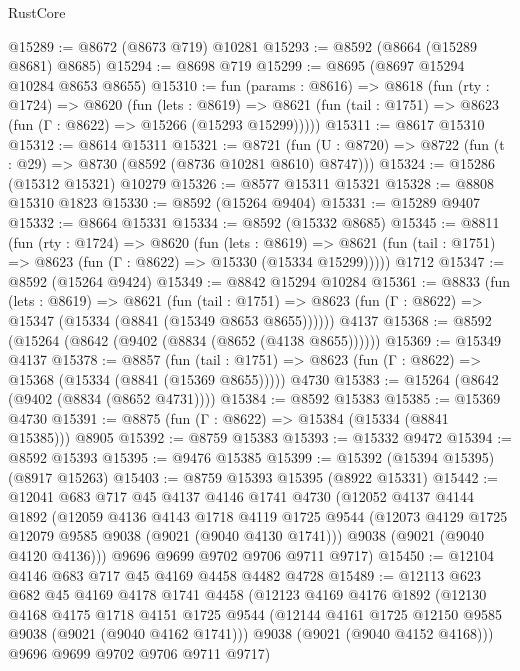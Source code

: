 \begin{lexlean}{RustCore}
\begin{coremodule}
@15289 := @8672 (@8673 @719) @10281
@15293 := @8592 (@8664 (@15289 @8681) @8685)
@15294 := @8698 @719
@15299 := @8695 (@8697 @15294 @10284 @8653 @8655)
@15310 := fun (params : @8616) =>
  @8618
    (fun (rty : @1724) =>
    @8620
      (fun (lets : @8619) =>
      @8621 (fun (tail : @1751) => @8623 (fun (Γ : @8622) => @15266 (@15293 @15299)))))
@15311 := @8617 @15310
@15312 := @8614 @15311
@15321 := @8721
    (fun (U : @8720) => @8722 (fun (t : @29) => @8730 (@8592 (@8736 @10281 @8610) @8747)))
@15324 := @15286 (@15312 @15321) @10279
@15326 := @8577 @15311 @15321
@15328 := @8808 @15310 @1823
@15330 := @8592 (@15264 @9404)
@15331 := @15289 @9407
@15332 := @8664 @15331
@15334 := @8592 (@15332 @8685)
@15345 := @8811
    (fun (rty : @1724) =>
    @8620
      (fun (lets : @8619) =>
      @8621 (fun (tail : @1751) => @8623 (fun (Γ : @8622) => @15330 (@15334 @15299)))))
    @1712
@15347 := @8592 (@15264 @9424)
@15349 := @8842 @15294 @10284
@15361 := @8833
    (fun (lets : @8619) =>
    @8621
      (fun (tail : @1751) =>
      @8623 (fun (Γ : @8622) => @15347 (@15334 (@8841 (@15349 @8653 @8655))))))
    @4137
@15368 := @8592 (@15264 (@8642 (@9402 (@8834 (@8652 (@4138 @8655))))))
@15369 := @15349 @4137
@15378 := @8857
    (fun (tail : @1751) => @8623 (fun (Γ : @8622) => @15368 (@15334 (@8841 (@15369 @8655)))))
    @4730
@15383 := @15264 (@8642 (@9402 (@8834 (@8652 @4731))))
@15384 := @8592 @15383
@15385 := @15369 @4730
@15391 := @8875 (fun (Γ : @8622) => @15384 (@15334 (@8841 @15385))) @8905
@15392 := @8759 @15383
@15393 := @15332 @9472
@15394 := @8592 @15393
@15395 := @9476 @15385
@15399 := @15392 (@15394 @15395) (@8917 @15263)
@15403 := @8759 @15393 @15395 (@8922 @15331)
@15442 := @12041
    @683
    @717
    @45
    @4137
    @4146
    @1741
    @4730
    (@12052
      @4137
      @4144
      @1892
      (@12059
        @4136
        @4143
        @1718
        @4119
        @1725
        @9544
        (@12073 @4129 @1725 @12079 @9585 @9038 (@9021 (@9040 @4130 @1741)))
        @9038
        (@9021 (@9040 @4120 @4136)))
      @9696
      @9699
      @9702
      @9706
      @9711
      @9717)
@15450 := @12104 @4146 @683 @717 @45 @4169 @4458 @4482 @4728
@15489 := @12113
    @623
    @682
    @45
    @4169
    @4178
    @1741
    @4458
    (@12123
      @4169
      @4176
      @1892
      (@12130
        @4168
        @4175
        @1718
        @4151
        @1725
        @9544
        (@12144 @4161 @1725 @12150 @9585 @9038 (@9021 (@9040 @4162 @1741)))
        @9038
        (@9021 (@9040 @4152 @4168)))
      @9696
      @9699
      @9702
      @9706
      @9711
      @9717)

\end{coremodule}
\end{lexlean}
